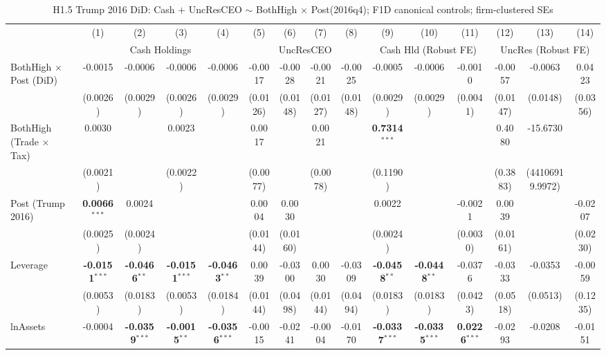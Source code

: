 \begin{landscape}
\begin{table}[H]
\setlength{\tabcolsep}{3pt}
\renewcommand{\arraystretch}{0.85}
\centering
\caption{H1.5 Trump 2016 DiD: Cash $+$ UncResCEO $\sim$ BothHigh $\times$ Post(2016q4); F1D canonical controls; firm-clustered SEs}
\label{tab:h1_5_trump_did}
\scriptsize
\begin{tabular}{lcccccccccccccc}
\toprule
 & (1) & (2) & (3) & (4) & (5) & (6) & (7) & (8) & (9) & (10) & (11) & (12) & (13) & (14) \\
 & \multicolumn{4}{c}{Cash Holdings} & \multicolumn{4}{c}{UncResCEO} & \multicolumn{3}{c}{Cash Hld (Robust FE)} & \multicolumn{3}{c}{UncRes (Robust FE)} \\
\cmidrule(lr){2-5} \cmidrule(lr){6-9} \cmidrule(lr){10-12} \cmidrule(lr){13-15}
\midrule
BothHigh $\times$ Post (DiD) & -0.0015 & -0.0006 & -0.0006 & -0.0006 & -0.0017 & -0.0028 & -0.0021 & -0.0025 & -0.0005 & -0.0006 & -0.0010 & -0.0057 & -0.0063 & 0.0423 \\
 & (0.0026) & (0.0029) & (0.0026) & (0.0029) & (0.0126) & (0.0148) & (0.0127) & (0.0148) & (0.0029) & (0.0029) & (0.0041) & (0.0147) & (0.0148) & (0.0356) \\
BothHigh (Trade $\times$ Tax) & 0.0030 &  & 0.0023 &  & 0.0017 &  & 0.0021 &  & \textbf{0.7314}$^{***}$ &  &  & 0.4080 & -15.6730 &  \\
 & (0.0021) &  & (0.0022) &  & (0.0077) &  & (0.0078) &  & (0.1190) &  &  & (0.3883) & (44106919.9972) &  \\
Post (Trump 2016) & \textbf{0.0066}$^{***}$ & 0.0024 &  &  & 0.0004 & 0.0030 &  &  & 0.0022 &  & -0.0021 & 0.0039 &  & -0.0207 \\
 & (0.0025) & (0.0024) &  &  & (0.0144) & (0.0160) &  &  & (0.0024) &  & (0.0030) & (0.0161) &  & (0.0230) \\
\midrule
Leverage & \textbf{-0.0151}$^{***}$ & \textbf{-0.0466}$^{**}$ & \textbf{-0.0151}$^{***}$ & \textbf{-0.0463}$^{**}$ & 0.0039 & -0.0300 & 0.0030 & -0.0309 & \textbf{-0.0458}$^{**}$ & \textbf{-0.0448}$^{**}$ & -0.0376 & -0.0333 & -0.0353 & -0.0059 \\
 & (0.0053) & (0.0183) & (0.0053) & (0.0184) & (0.0144) & (0.0498) & (0.0144) & (0.0494) & (0.0183) & (0.0183) & (0.0423) & (0.0518) & (0.0513) & (0.1235) \\
lnAssets & -0.0004 & \textbf{-0.0359}$^{***}$ & \textbf{-0.0015}$^{**}$ & \textbf{-0.0356}$^{***}$ & -0.0015 & -0.0241 & -0.0004 & -0.0170 & \textbf{-0.0337}$^{***}$ & \textbf{-0.0335}$^{***}$ & \textbf{0.0226}$^{***}$ & -0.0293 & -0.0208 & -0.0151 \\

\end{tabular}
\end{table}
\end{landscape}

